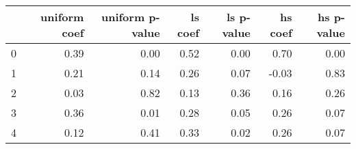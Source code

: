 \begin{tabular}{lrrrrrr}
\toprule
 & uniform coef & uniform p-value & ls coef & ls p-value & hs coef & hs p-value \\
\midrule
0 & 0.39 & 0.00 & 0.52 & 0.00 & 0.70 & 0.00 \\
1 & 0.21 & 0.14 & 0.26 & 0.07 & -0.03 & 0.83 \\
2 & 0.03 & 0.82 & 0.13 & 0.36 & 0.16 & 0.26 \\
3 & 0.36 & 0.01 & 0.28 & 0.05 & 0.26 & 0.07 \\
4 & 0.12 & 0.41 & 0.33 & 0.02 & 0.26 & 0.07 \\
\bottomrule
\end{tabular}
